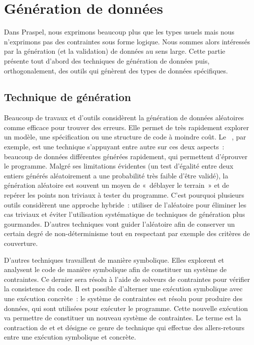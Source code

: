 \section{Génération de données}
\label{section:sota:data_generation}

Dans Praspel, nous exprimons beaucoup plus que les types usuels mais nous
n'exprimons pas des contraintes sous forme logique. Nous sommes alors intéressés
par la génération (et la validation) de données au sens large. Cette partie
présente tout d'abord des techniques de génération de données puis,
orthogonalement, des outils qui génèrent des types de données spécifiques.

\subsection{Technique de génération}

Beaucoup de travaux et d'outils considèrent la génération de données aléatoires
comme efficace pour trouver des erreurs. Elle permet de très rapidement explorer
un modèle, une spécification ou une structure de code à moindre coût. Le
~, par exemple, est une technique
s'appuyant entre autre sur ces deux aspects~: beaucoup de données différentes
générées rapidement, qui permettent d'éprouver le programme. Malgré ses
limitations évidentes (un test d'égalité entre deux entiers générés
aléatoirement a une probabilité très faible d'être validé), la génération
aléatoire est souvent un moyen de «~déblayer le terrain~» et de repérer les
points non triviaux à tester du programme. C'est pourquoi plusieurs outils
considèrent une approche hybride~: utiliser de l'aléatoire pour éliminer les cas
triviaux et éviter l'utilisation systématique de techniques de génération plus
gourmandes. D'autres techniques vont guider l'aléatoire afin de conserver un
certain degré de non-déterminisme tout en respectant par exemple des critères de
couverture.

D'autres techniques travaillent de manière symbolique. Elles explorent et
analysent le code de manière symbolique afin de constituer un système de
contraintes. Ce dernier sera résolu à l'aide de solveurs de contraintes pour
vérifier la consistence du code. Il est possible d'alterner une exécution
symbolique avec une exécution concrète~: le système de contraintes est résolu
pour produire des données, qui sont utilisées pour exécuter le programme. Cette
nouvelle exécution va permettre de constituer un nouveau système de contraintes.
Le terme  est la contraction de  et
 et désigne ce genre de technique qui effectue des
allers-retours entre une exécution symbolique et concrète.

